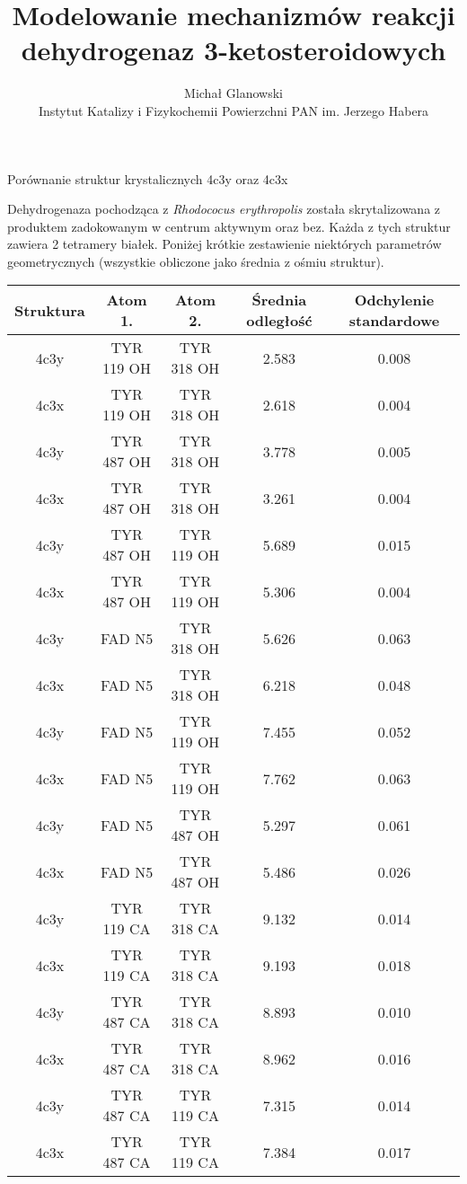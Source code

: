 \documentclass[10pt,a4paper]{article}
\title{Modelowanie mechanizmów reakcji dehydrogenaz 3-ketosteroidowych}
\author{Michał Glanowski\\ Instytut Katalizy i Fizykochemii Powierzchni PAN im. Jerzego Habera}
\begin{document}
\maketitle
\begin{section} {Porównanie struktur krystalicznych 4c3y oraz 4c3x}

Dehydrogenaza pochodząca z \textit{Rhodococus erythropolis} została skrytalizowana z produktem zadokowanym w centrum aktywnym oraz bez. Każda z tych struktur zawiera 2 tetramery 
białek. Poniżej krótkie zestawienie niektórych parametrów geometrycznych (wszystkie obliczone jako średnia z ośmiu struktur).

 \begin{tabular}{||c c c c c||} 
 \hline
 Struktura & Atom 1. & Atom 2. & Średnia odległość & Odchylenie standardowe \\ [0.5ex] 
 \hline\hline
4c3y & TYR 119 OH &  TYR 318 OH & 2.583 &0.008\\
4c3x & TYR 119 OH  & TYR 318 OH &  2.618 &0.004\\
4c3y & TYR 487 OH  & TYR 318 OH & 3.778 &0.005\\
4c3x & TYR 487 OH  & TYR 318 OH  & 3.261 &0.004\\
4c3y & TYR 487 OH  & TYR 119 OH & 5.689 &0.015\\
4c3x & TYR 487 OH  & TYR 119 OH  & 5.306 &0.004\\
4c3y & FAD N5 &  TYR 318 OH & 5.626 &0.063\\
4c3x & FAD N5 &  TYR 318 OH &  6.218 &0.048\\
4c3y & FAD N5 &  TYR 119 OH & 7.455 &0.052\\
4c3x & FAD N5 &  TYR 119 OH &  7.762 &0.063\\
4c3y & FAD N5 &  TYR 487 OH & 5.297 &0.061\\
4c3x & FAD N5 &  TYR 487 OH &   5.486 &0.026\\
4c3y & TYR 119 CA &  TYR 318 CA & 9.132 & 0.014\\
4c3x & TYR 119 CA &  TYR 318 CA  & 9.193 & 0.018\\
4c3y & TYR 487 CA &  TYR 318 CA & 8.893 & 0.010\\
4c3x & TYR 487 CA &  TYR 318 CA  & 8.962 & 0.016\\
4c3y & TYR 487 CA &  TYR 119 CA & 7.315 & 0.014\\
4c3x & TYR 487 CA &  TYR 119 CA  & 7.384 & 0.017\\
 \hline
 
\end{tabular}
 
\end{section}
\end{document}
